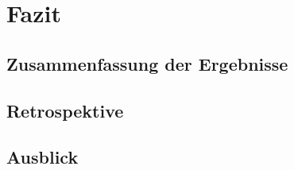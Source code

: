 \chapter{Fazit}

\section{Zusammenfassung der Ergebnisse}


\section{Retrospektive}


\section{Ausblick}

